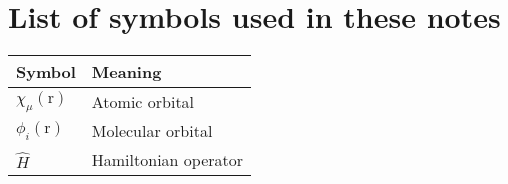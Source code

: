 \documentclass[../Main/chem371-notes.tex]{subfiles}
\begin{document}
\section*{List of symbols used in these notes}
\begin{center}
\begin{tabular}{@{} ll @{}} %
\toprule
Symbol & Meaning \\
\midrule
$\chi_\mu(\mathrm{r})$ & Atomic orbital \\
$\phi_i(\mathrm{r})$ & Molecular orbital \\
$\hat{H}$ & Hamiltonian operator \\
\bottomrule
\end{tabular}
\end{center}
\end{document}
